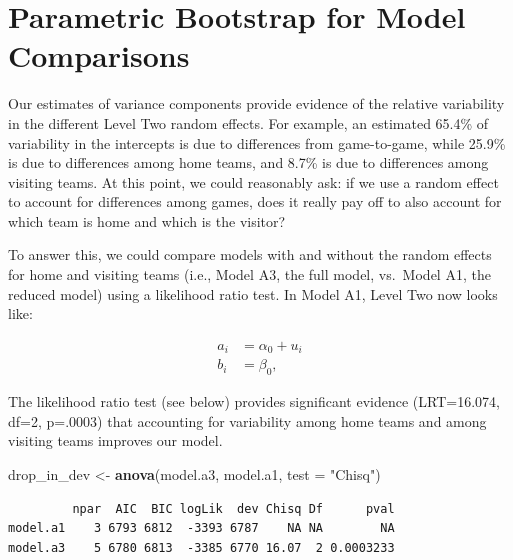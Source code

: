 \documentclass[
]{krantz}
\newenvironment{Shaded}{\begin{snugshade}}{\end{snugshade}}
\newcommand{\AttributeTok}[1]{\textcolor[rgb]{0.27,0.27,0.27}{#1}}
\newcommand{\FunctionTok}[1]{\textcolor[rgb]{0.27,0.27,0.27}{\textbf{#1}}}
\newcommand{\NormalTok}[1]{#1}
\newcommand{\OtherTok}[1]{\textcolor[rgb]{0.37,0.37,0.37}{#1}}
\newcommand{\StringTok}[1]{\textcolor[rgb]{0.5,0.5,0.5}{#1}}
\begin{document}
\section{Parametric Bootstrap for Model Comparisons}\label{glmm-paraboot}

Our estimates of variance components provide evidence of the relative variability in the different Level Two random effects. For example, an estimated 65.4\% of variability in the intercepts is due to differences from game-to-game, while 25.9\% is due to differences among home teams, and 8.7\% is due to differences among visiting teams. At this point, we could reasonably ask: if we use a random effect to account for differences among games, does it really pay off to also account for which team is home and which is the visitor?

To answer this, we could compare models with and without the random effects for home and visiting teams (i.e., Model A3, the full model, vs.~Model A1, the reduced model) using a likelihood ratio test. In Model A1, Level Two now looks like:

\begin{align*}
a_{i} & = \alpha_{0}+u_{i} \\
b_{i} & = \beta_{0},
\end{align*}

The likelihood ratio test (see below) provides significant evidence (LRT=16.074, df=2, p=.0003) that accounting for variability among home teams and among visiting teams improves our model.

\begin{Shaded}
\begin{Highlighting}[]
\NormalTok{drop\_in\_dev }\OtherTok{\textless{}{-}} \FunctionTok{anova}\NormalTok{(model.a3, model.a1, }\AttributeTok{test =} \StringTok{"Chisq"}\NormalTok{)}
\end{Highlighting}
\end{Shaded}

\begin{verbatim}
         npar  AIC  BIC logLik  dev Chisq Df      pval
model.a1    3 6793 6812  -3393 6787    NA NA        NA
model.a3    5 6780 6813  -3385 6770 16.07  2 0.0003233
\end{verbatim}
\end{document}
